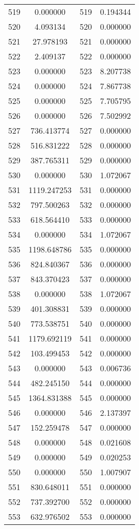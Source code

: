 \documentclass[12pt]{article}
\begin{document}
\begin{longtable}{@{}cccc@{}}
519 & 0.000000 & 519 & 0.194344 \\
520 & 4.093134 & 520 & 0.000000 \\
521 & 27.978193 & 521 & 0.000000 \\
522 & 2.409137 & 522 & 0.000000 \\
523 & 0.000000 & 523 & 8.207738 \\
524 & 0.000000 & 524 & 7.867738 \\
525 & 0.000000 & 525 & 7.705795 \\
526 & 0.000000 & 526 & 7.502992 \\
527 & 736.413774 & 527 & 0.000000 \\
528 & 516.831222 & 528 & 0.000000 \\
529 & 387.765311 & 529 & 0.000000 \\
530 & 0.000000 & 530 & 1.072067 \\
531 & 1119.247253 & 531 & 0.000000 \\
532 & 797.500263 & 532 & 0.000000 \\
533 & 618.564410 & 533 & 0.000000 \\
534 & 0.000000 & 534 & 1.072067 \\
535 & 1198.648786 & 535 & 0.000000 \\
536 & 824.840367 & 536 & 0.000000 \\
537 & 843.370423 & 537 & 0.000000 \\
538 & 0.000000 & 538 & 1.072067 \\
539 & 401.308831 & 539 & 0.000000 \\
540 & 773.538751 & 540 & 0.000000 \\
541 & 1179.692119 & 541 & 0.000000 \\
542 & 103.499453 & 542 & 0.000000 \\
543 & 0.000000 & 543 & 0.006736 \\
544 & 482.245150 & 544 & 0.000000 \\
545 & 1364.831388 & 545 & 0.000000 \\
546 & 0.000000 & 546 & 2.137397 \\
547 & 152.259478 & 547 & 0.000000 \\
548 & 0.000000 & 548 & 0.021608 \\
549 & 0.000000 & 549 & 0.020253 \\
550 & 0.000000 & 550 & 1.007907 \\
551 & 830.648011 & 551 & 0.000000 \\
552 & 737.392700 & 552 & 0.000000 \\
553 & 632.976502 & 553 & 0.000000 \\

\end{longtable}
\end{document}
